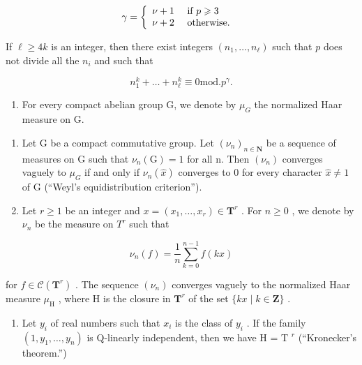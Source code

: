 \[
\gamma = \left\{ \begin{array}{l l} \nu + 1 & \text { if } p \geqslant 3 \\ \nu + 2 & \text { otherwise. } \end{array} \right.
\]

If \(\ell \geqslant 4k\) is an integer, then there exist integers \((n_1, \ldots, n_\ell)\) such that \(p\) does not divide all the \(n_i\) and such that

\[
n _ {1} ^ {k} + \dots + n _ {\ell} ^ {k} \equiv 0 \mathrm{mod.} p ^ {\gamma}.
\]

\begin{enumerate}
\def\labelenumi{\arabic{enumi})}
\setcounter{enumi}{33}
\tightlist
\item
  For every compact abelian group G, we denote by \(\mu_{G}\) the normalized Haar measure on G.
\end{enumerate}

\begin{enumerate}
\def\labelenumi{\alph{enumi})}
\item
  Let G be a compact commutative group. Let \((\nu_{n})_{n\in\mathbf{N}}\) be a sequence of measures on G such that \(\nu_{n}(\mathrm{G})=1\) for all n. Then \((\nu_{n})\) converges vaguely to \(\mu_{G}\) if and only if \(\nu_{n}(\widehat{x})\) converges to 0 for every character \(\widehat{x}\neq1\) of G (“Weyl's equidistribution criterion”).
\item
  Let \(r \geqslant 1\) be an integer and \(x = (x_{1}, \ldots, x_{r}) \in \mathbf{T}^{r}\) . For \(n \geqslant 0\) , we denote by \(\nu_{n}\) be the measure on \(T^{r}\) such that
\end{enumerate}

\[
\nu_ {n} (f) = \frac {1}{n} \sum_ {k = 0} ^ {n - 1} f (k x)
\]

for \(f \in \mathcal{C}(\mathbf{T}^r)\) . The sequence \((\nu_n)\) converges vaguely to the normalized Haar measure \(\mu_{\mathrm{H}}\) , where H is the closure in \(\mathbf{T}^r\) of the set \(\{kx \mid k \in \mathbf{Z}\}\) .

\begin{enumerate}
\def\labelenumi{\alph{enumi})}
\setcounter{enumi}{2}
\tightlist
\item
  Let \(y_{i}\) of real numbers such that \(x_{i}\) is the class of \(y_{i}\) . If the family \((1, y_{1}, \ldots, y_{n})\) is Q-linearly independent, then we have H = T \(^{r}\) (“Kronecker's theorem.”)
\end{enumerate}

